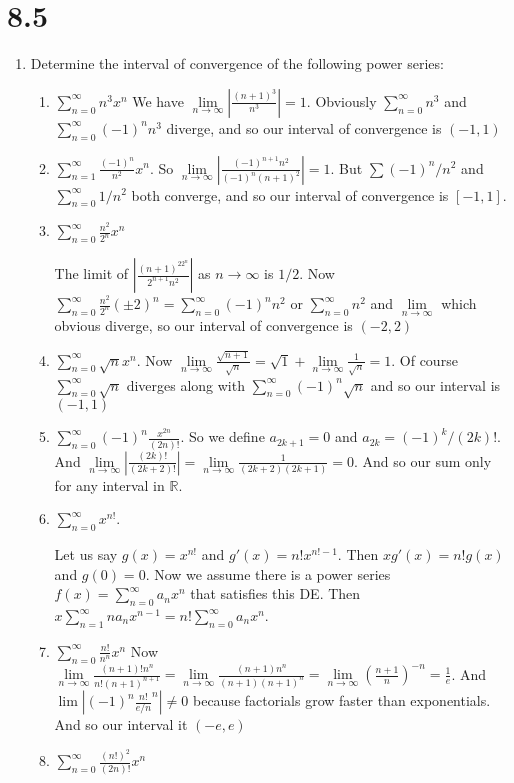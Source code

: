 \documentclass[letterpaper]{article}
\begin{document}
\section*{8.5}
\begin{enumerate}
\item
Determine the interval of convergence of the following power series:
  \begin{enumerate}
  \item
  $\sum\limits_{n=0}^\infty{n^3x^n}$ We have $\lim\limits_{n\to\infty}|\frac{(n+1)^3}{n^3}|=1$. Obviously $\sum\limits_{n=0}^\infty{n^3}$ and $\sum\limits_{n=0}^\infty{(-1)^nn^3}$ diverge, and so our interval of convergence is $(-1,1)$
  \item
  $\sum\limits_{n=1}^\infty{\frac{(-1)^n}{n^2}x^n}$. So $\lim\limits_{n\to\infty}\left\lvert\frac{(-1)^{n+1}n^2}{(-1)^n(n+1)^2}\right\rvert=1$. But $\sum\limits{(-1)^n/n^2}$ and $\sum\limits_{n=0}^\infty{1/n^2}$ both converge, and so our interval of convergence is $[-1,1]$.
  \item
  $\sum\limits_{n=0}^\infty{\frac{n^2}{2^n}x^n}$

  The limit of $\left\lvert\frac{(n+1)^22^n}{2^{n+1}n^2}\right\rvert$ as $n\to\infty$ is $1/2$.
  Now $\sum\limits_{n=0}^\infty{\frac{n^2}{2^n}(\pm2)^n}=\sum\limits_{n=0}^\infty{(-1)^nn^2}\text{ or }\sum\limits_{n=0}^\infty{n^2}$ and $\lim\limits_{n\to\infty}$ which obvious diverge, so our interval of convergence is $(-2,2)$
  \item
  $\sum\limits_{n=0}^\infty{\sqrt{n}x^n}$.
  Now $\lim\limits_{n\to\infty}\frac{\sqrt{n+1}}{\sqrt{n}}=\sqrt{1}+\lim\limits_{n\to\infty}\frac{1}{\sqrt{n}}=1$. Of course $\sum\limits_{n=0}^\infty{\sqrt{n}}$ diverges along with $\sum\limits_{n=0}^\infty{(-1)^n\sqrt{n}}$ and so our interval is $(-1,1)$
  \item
  $\sum\limits_{n=0}^\infty{(-1)^n\frac{x^{2n}}{(2n)!}}$.
So we define $a_{2k+1}=0$ and $a_{2k}=(-1)^k/(2k)!$. And $\lim\limits_{n\to\infty}\left\lvert\frac{(2k)!}{(2k+2)!}\right\rvert=\lim\limits_{n\to\infty}\frac{1}{(2k+2)(2k+1)}=0$. And so our sum only for any  interval in $\mathbb{R}$.
  \item
  $\sum\limits_{n=0}^\infty{x^{n!}}$.

  Let us say $g(x)=x^{n!}$ and $g'(x)=n!x^{n!-1}$. Then $xg'(x)=n!g(x)$ and $g(0)=0$. Now we assume there is a power series $f(x)=\sum\limits_{n=0}^\infty{a_nx^n}$ that satisfies this DE. Then $x\sum\limits_{n=1}^\infty{na_nx^{n-1}}=n!\sum\limits_{n=0}^\infty{a_nx^n}$.
  \item
  $\sum\limits_{n=0}^\infty{\frac{n!}{n^n}x^n}$
  Now $\lim\limits_{n\to\infty}\frac{(n+1)!n^n}{n!(n+1)^{n+1}}=\lim\limits_{n\to\infty}\frac{(n+1)n^n}{(n+1)(n+1)^n}=\lim\limits_{n\to\infty}\left(\frac{n+1}{n}\right)^{-n}=\frac{1}{e}$. And $\lim\left\lvert(-1)^n\frac{n!}{e/n}^n\right\rvert\ne 0$ because factorials grow faster than exponentials. And so our interval it $(-e,e)$
  \item
  $\sum\limits_{n=0}^\infty{\frac{(n!)^2}{(2n)!}x^n}$


\end{enumerate}
\end{enumerate}
\end{document}
